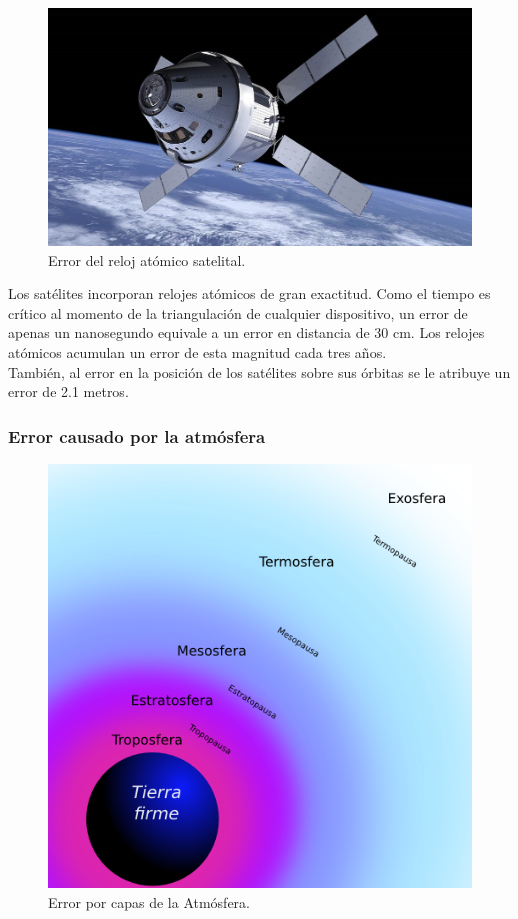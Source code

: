 \begin{figure}[!ht]
\centering
\includegraphics[scale=0.23]{Figures/Sat}
\caption[Error del reloj atómico satelital.]{Error del reloj atómico satelital.}
\label{fig:ErrSat}
\end{figure}

Los satélites incorporan relojes atómicos de gran exactitud. Como el tiempo es crítico al momento de la triangulación de cualquier dispositivo, un error de apenas un nanosegundo equivale a un error en distancia de 30 cm. Los relojes atómicos acumulan un error de esta magnitud cada tres años. \\

También, al error en la posición de los satélites sobre sus órbitas se le atribuye un error de 2.1 metros.

\subsubsection{Error causado por la atmósfera}

\begin{figure}[!ht]
\centering
\includegraphics[scale=0.48]{Figures/CapasAtm}
\caption[Error por capas de la Atmósfera.]{Error por capas de la Atmósfera.}
\label{fig:ErrAtm}
\end{figure}

